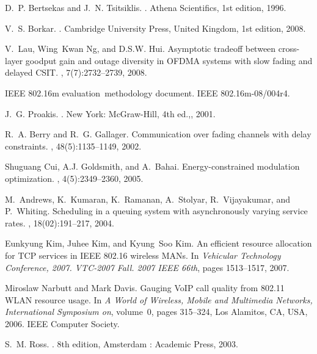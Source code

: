\documentclass[11pt,journal, onecolumn]{./IEEEtran}
\begin{document}
\begin{thebibliography}{10}
D.~{P. Bertsekas} and J.~{N. Tsitsiklis}.
.
\newblock Athena Scientifics, 1st edition, 1996.

V.~{S. Borkar}.
.
\newblock Cambridge University Press, United Kingdom, 1st edition, 2008.

V.~Lau, Wing~Kwan Ng, and {D.S.W.} Hui.
\newblock Asymptotic tradeoff between cross-layer goodput gain and outage
  diversity in {OFDMA} systems with slow fading and delayed {CSIT}.
,
  7(7):2732--2739, 2008.

IEEE 802.16m evaluation~methodology document.
\newblock IEEE 802.16m-08/004r4.

J.~G. Proakis.
.
\newblock New York: McGraw-Hill, 4th ed.,, 2001.

R.~A. Berry and R.~G. Gallager.
\newblock Communication over fading channels with delay constraints.
, 48(5):1135–1149,
  2002.

Shuguang Cui, {A.J.} Goldsmith, and A.~Bahai.
\newblock Energy-constrained modulation optimization.
,
  4(5):2349--2360, 2005.

M.~Andrews, K.~Kumaran, K.~Ramanan, A.~Stolyar, R.~Vijayakumar, and P.~Whiting.
\newblock Scheduling in a queuing system with asynchronously varying service
  rates.
,
  18(02):191–217, 2004.

Eunkyung Kim, Juhee Kim, and Kyung~Soo Kim.
\newblock An efficient resource allocation for {TCP} services in {IEEE} 802.16
  wireless {MANs}.
\newblock In {\em Vehicular Technology Conference, 2007. {VTC-2007} Fall. 2007
  {IEEE} 66th}, pages 1513--1517, 2007.

Miroslaw Narbutt and Mark Davis.
\newblock Gauging {VoIP} call quality from 802.11 {WLAN} resource usage.
\newblock In {\em A World of Wireless, Mobile and Multimedia Networks,
  International Symposium on}, volume~0, pages 315--324, Los Alamitos, {CA,}
  {USA}, 2006. {IEEE} Computer Society.

S.~M. Ross.
.
\newblock 8th edition, Amsterdam : Academic Press, 2003.

\end{thebibliography}
\end{document}
